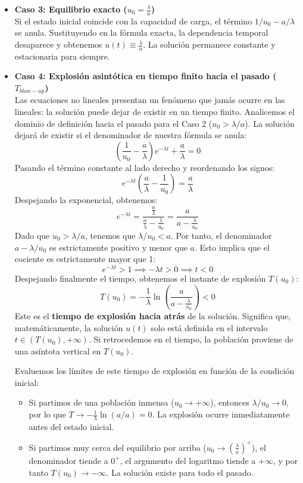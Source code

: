 {\begin{itemize}
        \item \textbf{Caso 3: Equilibrio exacto ($u_0 = \frac{\lambda}{a}$)} \\
        Si el estado inicial coincide con la capacidad de carga, el término $1/u_0 - a/\lambda$ se anula. Sustituyendo en la fórmula exacta, la dependencia temporal desaparece y obtenemos $u(t) \equiv \frac{\lambda}{a}$. La solución permanece constante y estacionaria para siempre.
        
        \item \textbf{Caso 4: Explosión asintótica en tiempo finito hacia el pasado ($T_{blow-up}$)} \\
        Las ecuaciones no lineales presentan un fenómeno que jamás ocurre en las lineales: la solución puede dejar de existir en un tiempo finito. Analicemos el dominio de definición hacia el pasado para el Caso 2 ($u_0 > \lambda/a$). La solución dejará de existir si el denominador de nuestra fórmula se anula:
        \[
            \left(\frac{1}{u_0} - \frac{a}{\lambda}\right) e^{-\lambda t} + \frac{a}{\lambda} = 0 
        \]
        Pasando el término constante al lado derecho y reordenando los signos:
        \[
            e^{-\lambda t} \left(\frac{a}{\lambda} - \frac{1}{u_0}\right) = \frac{a}{\lambda} 
        \]
        Despejando la exponencial, obtenemos:
        \[
            e^{-\lambda t} = \frac{\frac{a}{\lambda}}{\frac{a}{\lambda} - \frac{1}{u_0}} = \frac{a}{a - \frac{\lambda}{u_0}}
        \]
        Dado que $u_0 > \lambda/a$, tenemos que $\lambda/u_0 < a$. Por tanto, el denominador $a - \lambda/u_0$ es estrictamente positivo y menor que $a$. Esto implica que el cociente es estrictamente mayor que 1:
        \[
            e^{-\lambda t} > 1 \implies -\lambda t > 0 \implies t < 0
        \]
        Despejando finalmente el tiempo, obtenemos el instante de explosión $T(u_0)$:
        \[
            T(u_0) = -\frac{1}{\lambda} \ln\left( \frac{a}{a - \frac{\lambda}{u_0}} \right) < 0
        \]
        Este es el \textbf{tiempo de explosión hacia atrás} de la solución. Significa que, matemáticamente, la solución $u(t)$ solo está definida en el intervalo $t \in (T(u_0), +\infty)$. Si retrocedemos en el tiempo, la población proviene de una asíntota vertical en $T(u_0)$. 
        
        Evaluemos los límites de este tiempo de explosión en función de la condición inicial:
        \begin{itemize}
            \item Si partimos de una población inmensa ($u_0 \to +\infty$), entonces $\lambda/u_0 \to 0$, por lo que $T \to -\frac{1}{\lambda}\ln(a/a) = 0$. La explosión ocurre inmediatamente antes del estado inicial.
            \item Si partimos muy cerca del equilibrio por arriba ($u_0 \to (\frac{\lambda}{a})^+$), el denominador tiende a $0^+$, el argumento del logaritmo tiende a $+\infty$, y por tanto $T(u_0) \to -\infty$. La solución existe para todo el pasado.
        \end{itemize}
    \end{itemize}

}
